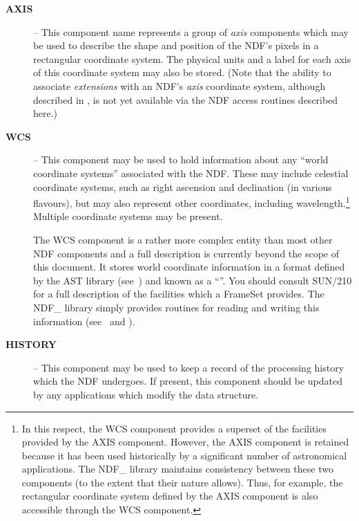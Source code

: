 \documentclass[twoside,11pt,nolof]{starlink}
\providecommand{\st}[1]{{\emph{#1}}}
\begin{document}
\begin{description}

\item[\textbf{AXIS}] -- This component name represents a group of \st{axis\/}
components which may be used to describe the shape and position of the NDF's
pixels in a rectangular coordinate system.
The physical units and a label for each axis of this coordinate system may
also be stored.
(Note that the ability to associate \st{extensions\/} with an NDF's
\st{axis\/} coordinate system, although described in
, is not yet
available via the NDF access routines described here.)

\item[\textbf{WCS}] -- This component may be used to hold information
about any ``world coordinate systems'' associated with the NDF. These
may include celestial coordinate systems, such as right ascension and
declination (in various flavours), but may also represent other
coordinates, including wavelength.\footnote{In this respect, the WCS
component provides a superset of the facilities provided by the AXIS
component. However, the AXIS component is retained because it has been
used historically by a significant number of astronomical
applications. The NDF\_ library maintains consistency between these
two components (to the extent that their nature allows). Thus, for
example, the rectangular coordinate system defined by the AXIS
component is also accessible through the WCS component.}  Multiple
coordinate systems may be present.

The WCS component is a rather more complex entity than most other NDF
components and a full description is currently beyond the scope of
this document. It stores world coordinate information in a format
defined by the AST library (see~) and known as
a ``''. You should consult SUN/210
for a full description of the facilities which a FrameSet
provides. The NDF\_ library simply provides routines for reading and
writing this information (see~ and
).

\item[\textbf{HISTORY}] -- This component may be used to keep a record of
the processing history which the NDF undergoes.
If present, this component should be updated by any applications which
modify the data structure.

\end{description}
\end{document}

